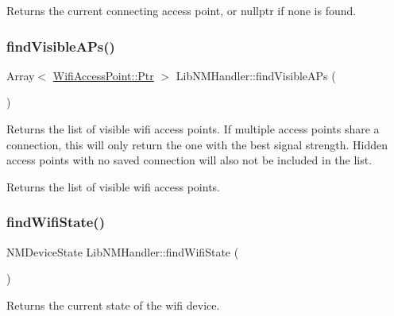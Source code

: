 \begin{DoxyReturn}{Returns}
the current connecting access point, or nullptr if none is found. 
\end{DoxyReturn}
\mbox{\label{classLibNMHandler_add13adb1e34a1159f31c3c1502bd48a2}} 
\subsubsection{\texorpdfstring{find\+Visible\+A\+Ps()}{findVisibleAPs()}}
{\footnotesize\ttfamily Array$<$ \mbox{\hyperlink{classWifiAccessPoint_ad18977f884076774803027efbaa131a0}{Wifi\+Access\+Point\+::\+Ptr}} $>$ Lib\+N\+M\+Handler\+::find\+Visible\+A\+Ps (\begin{DoxyParamCaption}{ }\end{DoxyParamCaption})\hspace{0.3cm}{\ttfamily [protected]}}

Returns the list of visible wifi access points. If multiple access points share a connection, this will only return the one with the best signal strength. Hidden access points with no saved connection will also not be included in the list.

Returns the list of visible wifi access points. \mbox{\label{classLibNMHandler_a65d0b0c93474dd2b1d0f2af651640a8e}} 
\subsubsection{\texorpdfstring{find\+Wifi\+State()}{findWifiState()}}
{\footnotesize\ttfamily N\+M\+Device\+State Lib\+N\+M\+Handler\+::find\+Wifi\+State (\begin{DoxyParamCaption}{ }\end{DoxyParamCaption})\hspace{0.3cm}{\ttfamily [protected]}}

\begin{DoxyReturn}{Returns}
the current state of the wifi device. 
\end{DoxyReturn}
\mbox{\label{classLibNMHandler_a3862693690fb2a2f6003bb82dec4d79c}} 
